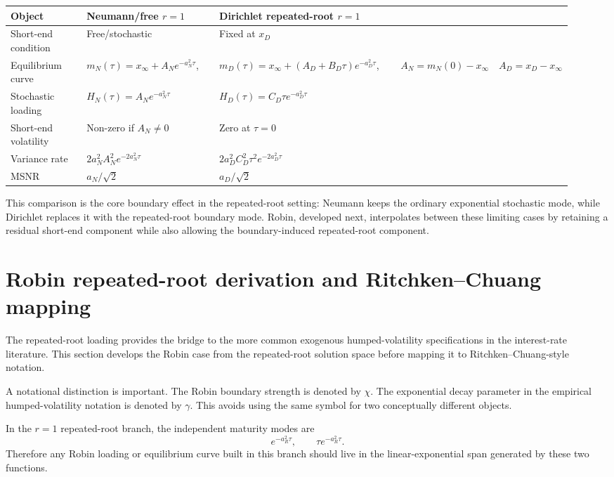 \documentclass[11pt]{article}
\numberwithin{equation}{section}
\begin{document}
\clearpage
\begin{longtable}{p{0.25\linewidth}p{0.34\linewidth}p{0.34\linewidth}}
\toprule
Object & Neumann/free $r=1$ & Dirichlet repeated-root $r=1$\\
\midrule
Short-end condition & Free/stochastic & Fixed at $x_D$\\
Equilibrium curve & $m_N(\tau)=x_\infty+A_Ne^{-a_N^2\tau}$,  & $m_D(\tau)=x_\infty+(A_D+B_D\tau)e^{-a_D^2\tau}$, & & $A_N=m_N(0)-x_\infty$ & $A_D=x_D-x_\infty$\\
Stochastic loading & $H_N(\tau)=A_Ne^{-a_N^2\tau}$ & $H_D(\tau)=C_D\tau e^{-a_D^2\tau}$\\
Short-end volatility & Non-zero if $A_N\neq0$ & Zero at $\tau=0$\\
Variance rate & $2a_N^2A_N^2e^{-2a_N^2\tau}$ & $2a_D^2C_D^2\tau^2e^{-2a_D^2\tau}$\\
MSNR & $a_N/\sqrt{2}$ & $a_D/\sqrt{2}$\\
\bottomrule
\end{longtable}

This comparison is the core boundary effect in the repeated-root setting: Neumann keeps the ordinary exponential stochastic mode, while Dirichlet replaces it with the repeated-root boundary mode. Robin, developed next, interpolates between these limiting cases by retaining a residual short-end component while also allowing the boundary-induced repeated-root component.

\section{Robin repeated-root derivation and Ritchken--Chuang mapping}

The repeated-root loading provides the bridge to the more common exogenous humped-volatility specifications in the interest-rate literature. This section develops the Robin case from the repeated-root solution space before mapping it to Ritchken--Chuang-style notation.

A notational distinction is important. The Robin boundary strength is denoted by $\chi$. The exponential decay parameter in the empirical humped-volatility notation is denoted by $\gamma$. This avoids using the same symbol for two conceptually different objects.

In the $r=1$ repeated-root branch, the independent maturity modes are
\begin{equation}
e^{-a_R^2\tau},
\qquad
\tau e^{-a_R^2\tau}.
\end{equation}
Therefore any Robin loading or equilibrium curve built in this branch should live in the linear-exponential span generated by these two functions.
\end{document}
